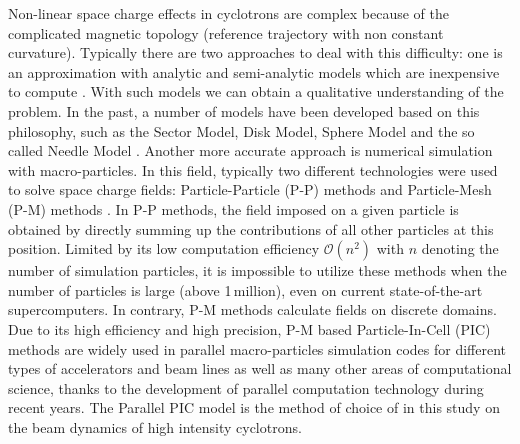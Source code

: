 \documentclass[aps,prstab,twocolumn,superscriptaddress,showpacs]{revtex4}
\begin{document}
Non-linear space charge effects in cyclotrons are complex because of the complicated magnetic topology (reference trajectory with non constant
curvature). Typically there are two approaches 
to deal with this difficulty: one is an approximation with analytic and semi-analytic models which are inexpensive to compute \cite{Bert:2001} \cite{kleeven:1}. With such models we can obtain a qualitative  
understanding of the problem. %
In the past, a number of models have been developed based on this philosophy, such as the Sector Model, Disk Model, Sphere Model and the so called Needle Model \cite{Gordon:1,Joho:1,Adam:1,Adam:2}. 
Another more accurate approach is numerical simulation with macro-particles. In this field, typically two different technologies were used to 
solve space charge fields: Particle-Particle (P-P) methods \cite{Li:1} and Particle-Mesh (P-M) methods \cite{Ada:1,Poz:1}. In P-P methods, the field imposed on 
a given particle is obtained by directly summing up the contributions of all other particles at this position. Limited by its low computation efficiency $\mathcal{O}(n^2)$ with $n$ denoting the number of simulation particles, 
it is impossible to utilize these methods when the number of particles is large (above 1\,million), even on current state-of-the-art supercomputers. In contrary, P-M methods
calculate fields on discrete domains. Due to its high efficiency and high precision, P-M based Particle-In-Cell (PIC) methods \cite{Hockney:1} 
are widely used in parallel macro-particles simulation codes for different types of accelerators and beam lines \cite{Ada:1,Qiang:1,Gala:1,Grote:1,Huang:1} 
as well as many other areas of computational science, thanks to the development of parallel computation technology during recent years. The Parallel PIC model is the method of choice of in this study on 
the beam dynamics of high intensity cyclotrons.
\end{document}

